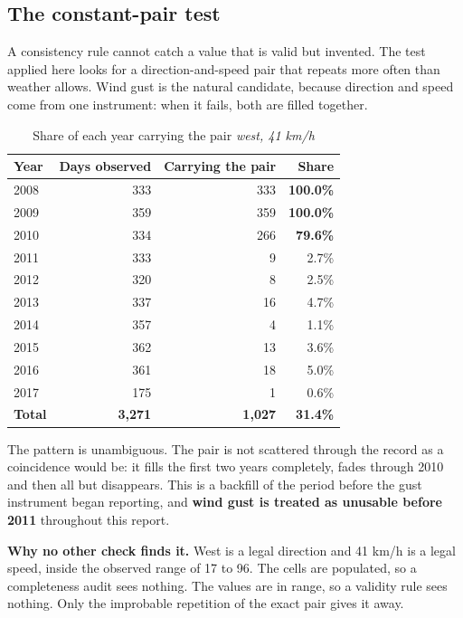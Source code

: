 \documentclass[12pt,a4paper]{article}
\begin{document}
\subsection{The constant-pair test}

A consistency rule cannot catch a value that is valid but invented. The test applied
here looks for a direction-and-speed pair that repeats more often than weather
allows. Wind gust is the natural candidate, because direction and speed come from one
instrument: when it fails, both are filled together.

\begin{table}[htbp]\centering
\caption{Share of each year carrying the pair \emph{west, 41 km/h}}
\small
\begin{tabular}{@{}lrrr@{}}
\toprule
\textbf{Year} & \textbf{Days observed} & \textbf{Carrying the pair} & \textbf{Share} \\
\midrule
2008 & 333 & 333 & \textbf{100.0\%} \\
2009 & 359 & 359 & \textbf{100.0\%} \\
2010 & 334 & 266 & \textbf{79.6\%} \\
2011 & 333 & 9 & 2.7\% \\
2012 & 320 & 8 & 2.5\% \\
2013 & 337 & 16 & 4.7\% \\
2014 & 357 & 4 & 1.1\% \\
2015 & 362 & 13 & 3.6\% \\
2016 & 361 & 18 & 5.0\% \\
2017 & 175 & 1 & 0.6\% \\
\midrule
\textbf{Total} & \textbf{3{,}271} & \textbf{1{,}027} & \textbf{31.4\%} \\
\bottomrule
\end{tabular}
\end{table}

The pattern is unambiguous. The pair is not scattered through the record as a
coincidence would be: it fills the first two years completely, fades through 2010 and
then all but disappears. This is a backfill of the period before the gust instrument
began reporting, and \textbf{wind gust is treated as unusable before 2011}
throughout this report.

\textbf{Why no other check finds it.} West is a legal direction and 41 km/h is a
legal speed, inside the observed range of 17 to 96. The cells are populated, so a
completeness audit sees nothing. The values are in range, so a validity rule sees
nothing. Only the improbable repetition of the exact pair gives it away.
\end{document}
